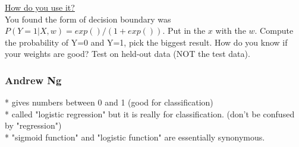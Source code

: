 \underline{How do you use it?}  \hfill \\
You found the form of decision boundary was $P(Y=1|X,w) = exp()/(1+ exp())$.
Put in the $x$ with the $w$.  
Compute the probability of Y=0 and Y=1, pick the biggest result. 
How do you know if your weights are good? 
Test on held-out data (NOT the test data). 

\subsubsection{Andrew Ng}
* gives numbers between 0 and 1 (good for classification)   \hfill \\
* called "logistic regression" but it is really for classification.  (don't be confused by "regression") \hfill \\
* "sigmoid function" and "logistic function" are essentially synonymous.  \hfill \\
 
